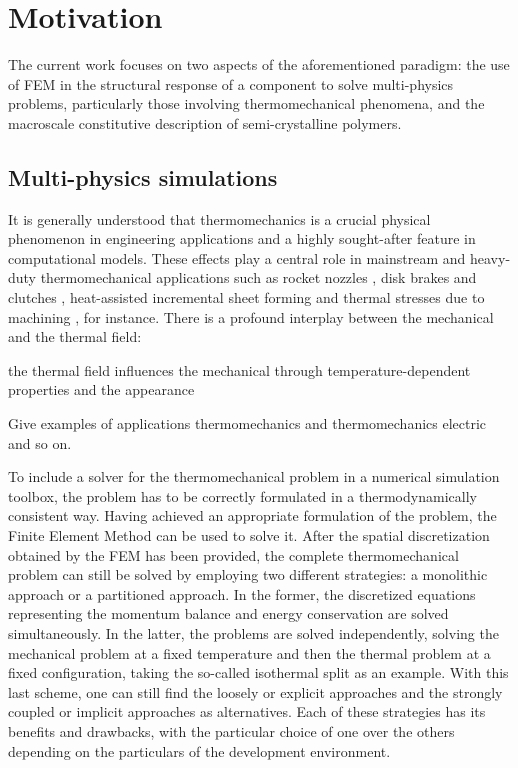 \section{Motivation}

The current work focuses on two aspects of the aforementioned paradigm: the use of FEM in the structural response of a component to solve multi-physics problems, particularly those involving thermomechanical phenomena, and the macroscale constitutive description of semi-crystalline polymers.

\subsection{Multi-physics simulations}

It is generally understood that thermomechanics is a crucial physical phenomenon in engineering applications and a highly sought-after feature in computational models.
These effects play a central role in mainstream and heavy-duty thermomechanical applications such as rocket nozzles \citep{kuhl2002ThermomechanicalAnalysisOptimization,danowski_monolithic_2013}, disk brakes and clutches \citep{yevtushenko2015NumericalAnalysisThermal}, heat-assisted incremental sheet forming \citep{liu2018HeatassistedIncrementalSheet} and thermal stresses due to machining \citep{elsheikh2021ComprehensiveReviewResidual}, for instance.
There is a profound interplay between the mechanical and the thermal field:
\begin{\itemize}
  \item the thermal field influences the mechanical through temperature-dependent properties and the appearance
\end{\itemize}

Give examples of applications thermomechanics and thermomechanics electric and so on.

To include a solver for the thermomechanical problem in a numerical simulation toolbox, the problem has to be correctly formulated in a thermodynamically consistent way.
Having achieved an appropriate formulation of the problem, the Finite Element Method can be used to solve it.
After the spatial discretization obtained by the FEM has been provided, the complete thermomechanical problem can still be solved by employing two different strategies: a monolithic approach or a partitioned approach.
In the former, the discretized equations representing the momentum balance and energy conservation are solved simultaneously.
In the latter, the problems are solved independently, solving the mechanical problem at a fixed temperature and then the thermal problem at a fixed configuration, taking the so-called isothermal split as an example.
With this last scheme, one can still find the loosely or explicit approaches and the strongly coupled or implicit approaches as alternatives.
Each of these strategies has its benefits and drawbacks, with the particular choice of one over the others depending on the particulars of the development environment.

